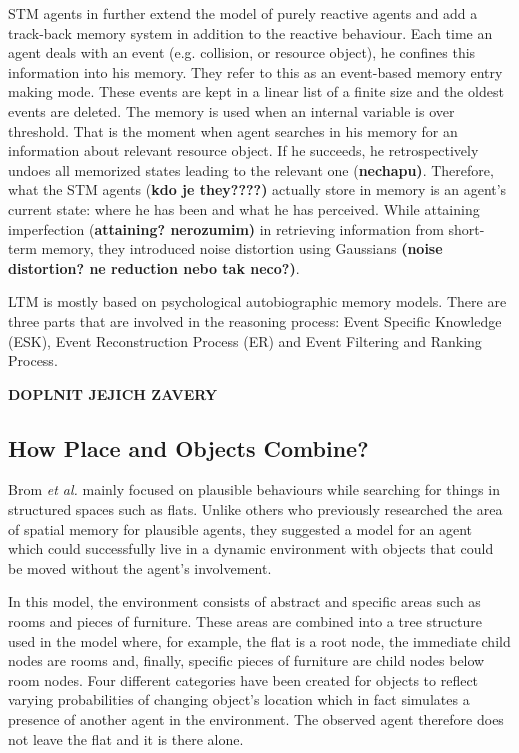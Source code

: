 STM agents in further extend the model of purely reactive agents and add a track-back memory system in addition to the reactive behaviour. Each time an agent deals with an event (e.g. collision, or resource object), he confines this information into his memory. They refer to this as an event-based memory entry making mode. These events are kept in a linear list of a finite size and the oldest events are deleted. The memory is used when an internal variable is over threshold. That is the moment when agent searches in his memory for an information about relevant resource object. If he succeeds, he retrospectively undoes all memorized states leading to the relevant one (\textbf{nechapu)}. Therefore, what the STM agents (\textbf{kdo je they????)} actually store in memory is an agent’s current state: where he has been and what he has perceived. While attaining imperfection (\textbf{attaining? nerozumim)} in retrieving information from short-term memory, they introduced noise distortion using Gaussians \textbf{(noise distortion? ne reduction nebo tak neco?)}.

LTM is mostly based on psychological autobiographic memory models. There are three parts that are involved in the reasoning process: Event Specific Knowledge (ESK), Event Reconstruction Process (ER) and Event Filtering and Ranking Process.

\textbf{DOPLNIT JEJICH ZAVERY}

\subsection{How Place and Objects Combine?}

Brom \textit{et al.} mainly focused on plausible behaviours while searching for things in structured spaces such as flats.\cite{Brom:placeandobjects} Unlike others who previously researched the area of spatial memory for plausible agents, they suggested a model for an agent which could successfully live in a dynamic environment with objects that could be moved without the agent’s involvement. 

In this model, the environment consists of abstract and specific areas such as rooms and pieces of furniture. These areas are combined into a tree structure used in the model where, for example, the flat is a root node, the immediate child nodes are rooms and, finally, specific pieces of furniture are child nodes below room nodes. Four different categories have been created for objects to reflect varying probabilities of changing object’s location which in fact simulates a presence of another agent in the environment. The observed agent therefore does not leave the flat and it is there alone.

